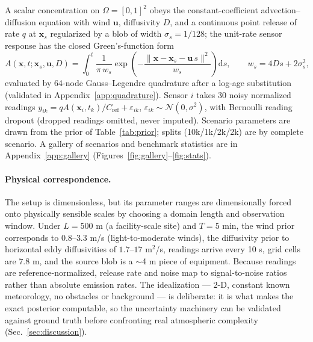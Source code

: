 \documentclass{article}
\newcommand{\Cref}{C_{\mathrm{ref}}}
\begin{document}
A scalar concentration on $\Omega = [0,1]^2$ obeys the constant-coefficient
advection--diffusion equation with wind $\boldsymbol{u}$, diffusivity $D$, and a continuous
point release of rate $q$ at $\boldsymbol{x}_s$ regularized by a blob of width
$\sigma_s = 1/128$; the unit-rate sensor response has the closed Green's-function form
\begin{equation}
A(\boldsymbol{x}, t; \boldsymbol{x}_s, \boldsymbol{u}, D)
= \int_0^t \frac{1}{\pi\, w_s} \exp\!\left(-\frac{\lVert \boldsymbol{x} - \boldsymbol{x}_s - \boldsymbol{u}\, s\rVert^2}{w_s}\right) \mathrm{d}s,
\qquad w_s = 4 D s + 2\sigma_s^2 ,
\label{eq:greens}
\end{equation}
evaluated by 64-node Gauss--Legendre quadrature after a log-age substitution
(validated in Appendix~\ref{app:quadrature}). Sensor $i$ takes 30 noisy normalized
readings $y_{ik} = q A(\boldsymbol{x}_i, t_k)/\Cref + \varepsilon_{ik}$,
$\varepsilon_{ik} \sim \mathcal{N}(0, \sigma^2)$, with Bernoulli reading dropout (dropped
readings omitted, never imputed). Scenario parameters are drawn from the prior of
Table~\ref{tab:prior}; splits (10k/1k/2k/2k) are by complete scenario. A gallery of
scenarios and benchmark statistics are in Appendix~\ref{app:gallery}
(Figures~\ref{fig:gallery}--\ref{fig:stats}).

\paragraph{Physical correspondence.} The setup is dimensionless, but its parameter
ranges are dimensionally forced onto physically sensible scales by choosing a domain
length and observation window. Under $L = 500$ m (a facility-scale site) and
$T = 5$ min, the wind prior corresponds to $0.8$--$3.3$ m/s (light-to-moderate winds),
the diffusivity prior to horizontal eddy diffusivities of $1.7$--$17$ m$^2$/s, readings
arrive every 10 s, grid cells are $7.8$ m, and the source blob is a $\sim$4 m piece of
equipment. Because readings are reference-normalized, release rate and noise map to
signal-to-noise ratios rather than absolute emission rates. The idealization --- 2-D,
constant known meteorology, no obstacles or background --- is deliberate: it is what
makes the exact posterior computable, so the uncertainty machinery can be validated
against ground truth before confronting real atmospheric complexity
(Sec.~\ref{sec:discussion}).
\end{document}
